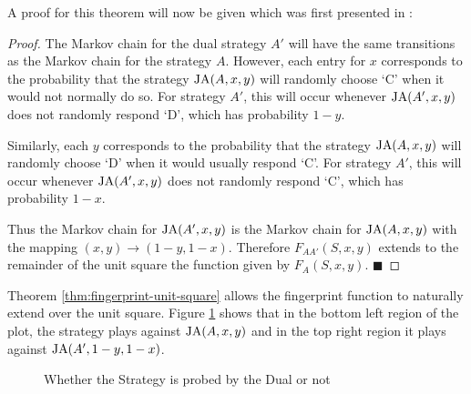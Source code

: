 A proof for this theorem will now be given which was first presented in \cite{Ashlock2004}:
\begin{proof}\label{prf:fingerprint-unit-square}
The Markov chain for the dual strategy $A'$ will have the same transitions as the Markov chain for the strategy $A$.
However, each entry for $x$ corresponds to the probability that the strategy $\text{JA}(A, x, y)$ will randomly choose `C' when it would not normally do so.
For strategy $A'$, this will occur whenever $\text{JA}(A', x, y)$ does not randomly respond `D', which has probability $1 - y$.

Similarly, each $y$ corresponds to the probability that the strategy $\text{JA}(A, x, y)$ will randomly choose `D' when it would usually respond `C'.
For strategy $A'$, this will occur whenever $\text{JA}(A', x, y)$ does not randomly respond `C', which has probability $1 - x$.

Thus the Markov chain for $\text{JA}(A', x, y)$ is the Markov chain for $\text{JA}(A, x, y)$ with the mapping $(x, y) \rightarrow (1-y, 1-x)$.
Therefore $F_{AA'}(S, x, y)$ extends to the remainder of the unit square the function given by $F_A(S, x, y)$. $\blacksquare$
\end{proof}

Theorem \ref{thm:fingerprint-unit-square} allows the fingerprint function to naturally extend over the unit square.
Figure \ref{fig:DualProbe} shows that in the \textcolor{sol-violet}{bottom left} region of the plot, the strategy plays against $\text{JA}(A, x, y)$ and in the \textcolor{sol-cyan}{top right} region it plays against $\text{JA}(A', 1-y, 1-x)$.

\begin{figure}[!hbtp]
    \begin{center}
        
        \caption{Whether the Strategy is probed by the Dual or not}\label{fig:DualProbe}
    \end{center}
\end{figure}




\solarizedPalette


